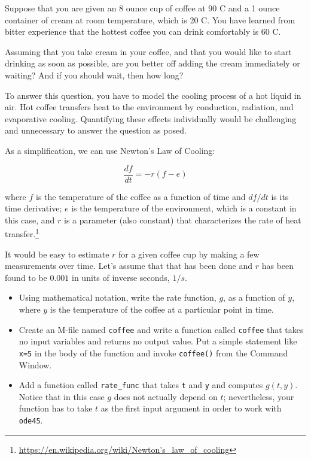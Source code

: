 \documentclass{book}
\begin{document}
\begin{ex}
Suppose that you are given an 8 ounce cup of coffee at 90 \degree C and
a 1 ounce container of cream at room temperature, which is 20 \degree C.
You have learned from bitter experience that the hottest coffee you
can drink comfortably is 60 \degree C.

Assuming that you take cream in your coffee, and that you would like
to start drinking as soon as possible, are you better off adding
the cream immediately or waiting?  And if you should wait, then how
long?

To answer this question, you have to model the cooling process
of a hot liquid in air.  Hot coffee transfers heat to the environment
by conduction, radiation, and evaporative cooling.  Quantifying these
effects individually would be challenging and unnecessary to answer
the question as posed.

As a simplification, we can use Newton's Law of
Cooling:

\begin{equation}
\frac{df}{dt} = -r (f - e)
\end{equation}

%
where $f$ is the temperature of the coffee as a function of time and
$df/dt$ is its time derivative; $e$ is the temperature of the
environment, which is a constant in this case, and $r$ is a parameter
(also constant) that characterizes the rate of heat
transfer.\footnote{\url{https://en.wikipedia.org/wiki/Newton's_law_of_cooling}}

It would be easy to estimate $r$ for a given coffee cup by making
a few measurements over time.  Let's assume that that has been
done and $r$ has been found to be $0.001$ in units of inverse
seconds, $1/s$.

\begin{itemize}

\item Using mathematical notation, write the rate function, $g$,
as a function of $y$, where $y$ is the temperature of the
coffee at a particular point in time.

\item Create an M-file named {\tt coffee} and write a function
called {\tt coffee} that takes no input variables and returns no
output value.  Put a simple statement like {\tt x=5} in the body
of the function and invoke {\tt coffee()} from the Command Window.

\item Add a function called
{\tt rate\_func} that takes {\tt t} and {\tt y} and computes
$g(t,y)$.  Notice that in this case $g$ does not actually
depend on $t$; nevertheless, your function has to take $t$ as
the first input argument in order to work with {\tt ode45}.


\end{itemize}
\end{ex}
\end{document}
